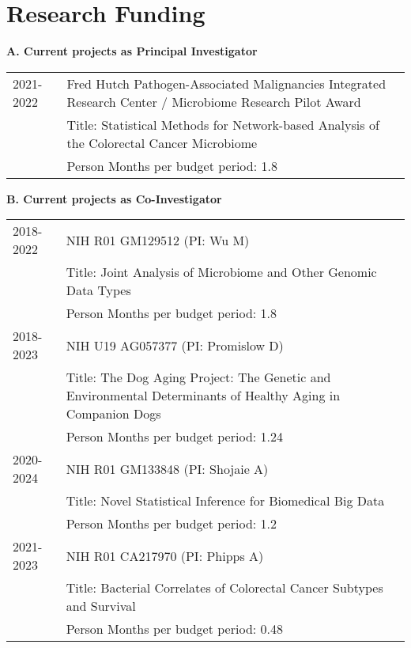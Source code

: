\documentclass[10pt]{article}
\begin{document}

\section*{Research Funding }

\textbf{A. Current projects as Principal Investigator}
\begin{table}[H]
\hskip0.9cm\begin{tabular}{p{1.6cm}p{12cm}}
2021-2022 & Fred Hutch Pathogen-Associated Malignancies Integrated Research Center / Microbiome Research Pilot Award  \\
& Title: Statistical Methods for Network-based Analysis of the Colorectal Cancer Microbiome \\
& Person Months per budget period: 1.8
\end{tabular}
\end{table}


\textbf{B. Current projects as Co-Investigator}

\begin{table}[H]
\hskip0.9cm\begin{tabular}{p{1.6cm}p{12cm}}
2018-2022 & NIH R01 GM129512 (PI: Wu M)  \\
& Title: Joint Analysis of Microbiome and Other Genomic Data Types\\
& Person Months per budget period: 1.8\\
2018-2023 & NIH U19 AG057377 (PI: Promislow D) \\
& Title: The Dog Aging Project: The Genetic and Environmental Determinants of Healthy Aging in Companion Dogs\\
& Person Months per budget period: 1.24\\
2020-2024 & NIH R01 GM133848 (PI: Shojaie A) \\
& Title: Novel Statistical Inference for Biomedical Big Data\\
& Person Months per budget period: 1.2\\
2021-2023 &  NIH R01 CA217970 (PI: Phipps A)\\
&Title: Bacterial Correlates of Colorectal Cancer Subtypes and Survival\\
& Person Months per budget period: 0.48\\
\end{tabular}
\end{table}
\end{document}
